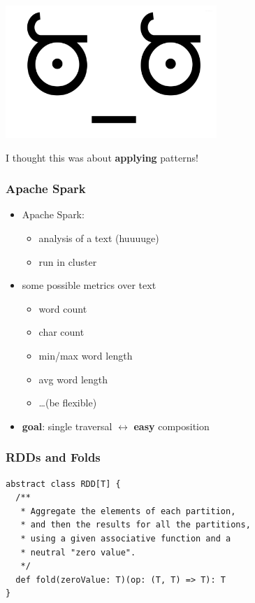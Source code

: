 \documentclass{beamer}
\begin{document}
\begin{frame}
  \begin{center}
    \includegraphics[width=0.6\textwidth]{../images/disapproval.jpg}
  \end{center}
  \begin{center}
    {\large I thought this was about \textbf{applying} patterns!}
  \end{center}
\end{frame}

\begin{frame}
  \frametitle{Apache Spark}
  \begin{itemize}
  \item Apache Spark:
    \begin{itemize}
    \item analysis of a text (huuuuge)
    \item run in cluster
    \end{itemize}
  \item some possible metrics over text
    \begin{itemize}
    \item word count
    \item char count
    \item min/max word length
    \item avg word length
    \item \dots (be flexible)
    \end{itemize}
  \item \textbf{goal}: single traversal $\leftrightarrow$ \textbf{easy} composition
  \end{itemize}
\end{frame}

\begin{frame}[fragile]
  \frametitle{RDDs and Folds}
\begin{verbatim}
abstract class RDD[T] {
  /**
   * Aggregate the elements of each partition,
   * and then the results for all the partitions,
   * using a given associative function and a
   * neutral "zero value".
   */
  def fold(zeroValue: T)(op: (T, T) => T): T
}
\end{verbatim}
\end{frame}
\end{document}
